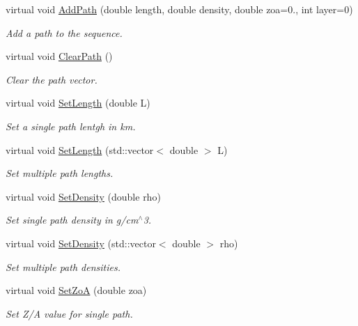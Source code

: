 \begin{DoxyCompactItemize}
virtual void \hyperlink{classOscProb_1_1PMNS__Base_ab7f89ad9e7e1224adaa59d3c41594cd9}{Add\+Path} (double length, double density, double zoa=0., int layer=0)
\begin{DoxyCompactList}\small\item\em Add a path to the sequence. \end{DoxyCompactList}\item 
virtual void \hyperlink{classOscProb_1_1PMNS__Base_aefe521239031c418cfaaaa550a6e13bb}{Clear\+Path} ()
\begin{DoxyCompactList}\small\item\em Clear the path vector. \end{DoxyCompactList}\item 
virtual void \hyperlink{classOscProb_1_1PMNS__Base_a6241325b1bd28cafa556daaecbe4ed62}{Set\+Length} (double L)
\begin{DoxyCompactList}\small\item\em Set a single path lentgh in km. \end{DoxyCompactList}\item 
virtual void \hyperlink{classOscProb_1_1PMNS__Base_aa34a40a3b5abda0f252982d9ead3b520}{Set\+Length} (std\+::vector$<$ double $>$ L)
\begin{DoxyCompactList}\small\item\em Set multiple path lengths. \end{DoxyCompactList}\item 
virtual void \hyperlink{classOscProb_1_1PMNS__Base_ac74206f349687da141392c81e2ba6b0d}{Set\+Density} (double rho)
\begin{DoxyCompactList}\small\item\em Set single path density in g/cm$^\wedge$3. \end{DoxyCompactList}\item 
virtual void \hyperlink{classOscProb_1_1PMNS__Base_a858221d5510fe732dc6a101fd305cda0}{Set\+Density} (std\+::vector$<$ double $>$ rho)
\begin{DoxyCompactList}\small\item\em Set multiple path densities. \end{DoxyCompactList}\item 
virtual void \hyperlink{classOscProb_1_1PMNS__Base_a1bf3ea8fd2507fd2fd82d7410ff8f578}{Set\+ZoA} (double zoa)
\begin{DoxyCompactList}\small\item\em Set Z/A value for single path. \end{DoxyCompactList}\item 

\end{DoxyCompactItemize}
